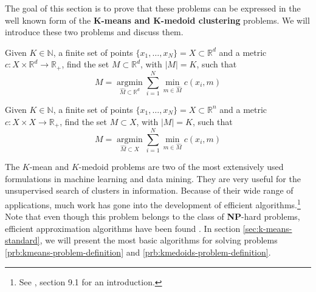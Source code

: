 The goal of this section is to prove that these problems can be expressed in the well known form of the \textbf{$\mathbf{K}$-means and $\mathbf{K}$-medoid clustering} problems.
We will introduce these two problems and discuss them.
\begin{problem}
  \label{prb:kmeans-problem-definition}
  Given $K\in \mathbb{N}$, a finite set of points $\{x_1,\ldots , x_N\} = X\subset\mathbb{R}^d$ and a metric $c:X\times \mathbb{R}^d\rightarrow\mathbb{R}_+$, find the set $M\subset\mathbb{R}^d$, with $|M|=K$, such that
  \begin{equation}
    \label{eq:kmeans-problem-definition}
    M = \underset{\hat{M}\subset\mathbb{R}^{d}}{\operatorname{argmin}} \sum_{i=1}^N\min\limits_{m\in \hat{M}}c(x_i, m)
  \end{equation}
\end{problem}
\begin{problem}
  \label{prb:kmedoids-problem-definition}
  Given $K\in \mathbb{N}$, a finite set of points $\{x_1,\ldots , x_N\} = X\subset\mathbb{R}^n$ and a metric $c:X\times X\rightarrow\mathbb{R}_+$, find the set $M\subset X$, with $|M|=K$, such that
  \begin{equation}
    \label{eq:kmedoids-problem-definition}
    M = \underset{\hat{M}\subset X}{\operatorname{argmin}} \sum_{i=1}^N\min\limits_{m\in \hat{M}}c(x_i, m)
  \end{equation}
\end{problem}
The $K$-mean and $K$-medoid problems are two of the most extensively used formulations in machine learning and data mining.
They are very useful for the unsupervised search of clusters in information.
Because of their wide range of applications, much work has gone into the development of efficient algorithms.\footnote{See \citet{Bishop2006}, section 9.1 for an introduction.}
Note that even though this problem belongs to the class of \textbf{NP}-hard problems, efficient approximation algorithms have been found \citep{Vazirani2003}.
In section \ref{sec:k-means-standard}, we will present the most basic algorithms for solving problems \ref{prb:kmeans-problem-definition} and \ref{prb:kmedoids-problem-definition}.
